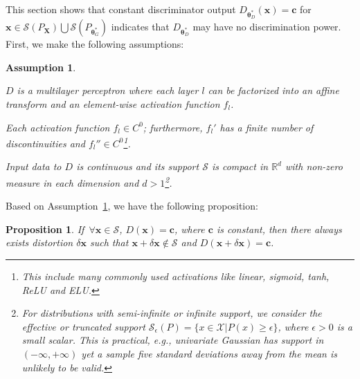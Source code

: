\documentclass{article} %
\theoremstyle{plain}
\newtheorem{assumption}{Assumption}
\newtheorem{proposition}{Proposition}
\newtheorem*{proposition 1*}{Proposition 1}
\newcommand{\ds}[1]{\mathcal{#1}}  %
\newcommand{\set}[1]{\mathbb{#1}}  %
\newcommand{\rdv}[1]{\mathbf{#1}}  %
\begin{document}
\begin{appendices}
This section shows that constant discriminator output \(D_{\bm{\theta}_D^*}(\bm{x})=\bm{c}\) for \(\bm{x}\in\ds{S}(P_{\rdv{X}})\bigcup\ds{S}(P_{\bm{\theta}_G^*})\) indicates that \(D_{\bm{\theta}_D^*}\) may have no discrimination power. First, we make the following assumptions:
\begin{assumption}\label{Assum:DaP}
	\begin{enumerate*}
		\item \(D\) is a multilayer perceptron where each layer \(l\) can be factorized into an affine transform and an element-wise activation function \(f_l\).
		\item Each activation function \(f_l\in C^0\); furthermore, \(f_l'\) has a finite number of discontinuities and \(f_l''\in C^0\)\footnote{This include many commonly used activations like linear, sigmoid, tanh, ReLU and ELU.}. 
		\item Input data to \(D\) is continuous and its support \(\ds{S}\) is compact in \(\set{R}^{d}\) with non-zero measure in each dimension and \(d>1\)\footnote{For distributions with semi-infinite or infinite support, we consider the effective or truncated support \(\ds{S}_{\epsilon}(P)=\{x\in\ds{X}|P(x)\ge\epsilon\}\), where \(\epsilon>0\) is a small scalar. This is practical, e.g., univariate Gaussian has support in \((-\infty,+\infty)\) yet a sample five standard deviations away from the mean is unlikely to be valid.}. 
	\end{enumerate*}
\end{assumption}
Based on Assumption~\ref{Assum:DaP}, we have the following proposition:
\begin{proposition}\label{Prop:D_constant}
	If~\(\forall\bm{x}\in\ds{S}\), \(D(\bm{x})=\bm{c}\), where \(\bm{c}\) is constant, then there always exists distortion \(\delta\bm{x}\) such that \(\bm{x}+\delta\bm{x}\not\in\ds{S}\) and \(D(\bm{x}+\delta\bm{x})=\bm{c}\).
\end{proposition}


\end{appendices}
\end{document}
